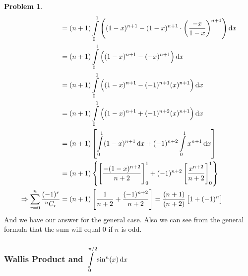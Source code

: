 \documentclass[14]{article}
\theoremstyle{definition}
\newtheorem{prob}{Problem}
\theoremstyle{case}
\begin{document}
\begin{prob}
\begin{align*}
&= (n+1) \int\limits_0^1 \left( (1-x)^{n+1} - (1-x)^{n+1} \cdot \left( \dfrac{-x}{1-x} \right)^{n+1} \right) \dif x\\
&= (n+1) \int\limits_0^1 \left( (1-x)^{n+1} - (-x)^{n+1} \right) \dif x\\
&= (n+1) \int\limits_0^1 \left( (1-x)^{n+1} - (-1)^{n+1}(x)^{n+1} \right) \dif x\\
&= (n+1) \int\limits_0^1 \left( (1-x)^{n+1} + (-1)^{n+2}(x)^{n+1} \right) \dif x\\
&= (n+1) \left[\int\limits_0^1 (1-x)^{n+1} \dif x + (-1)^{n+2}\int\limits_0^1 x^{n+1} \dif x \right]\\
&= (n+1) \left\{ \left[\dfrac{-(1-x)^{n+2}}{n+2}\right]_0^1 + (-1)^{n+2} \left[ \dfrac{x^{n+2}}{n+2} \right]_0^1 \right\}\\
\Rightarrow \sum\limits_{r=0}^{n} \dfrac{(-1)^r}{^nC_r} &= (n+1) \left[ \dfrac1{n+2} + \dfrac{(-1)^{n+2}}{n+2} \right] = \dfrac{(n+1)}{(n+2)}\left[ 1 + (-1)^{n} \right]
\end{align*}
And we have our answer for the general case. Also we can see from the general formula that the sum will equal $0$ if $n$ is odd.
\end{prob}
\subsubsection{Wallis Product and $\displaystyle\int\limits_0^{\pi/2} \sin^n(x) \dif x$}
\end{document}

